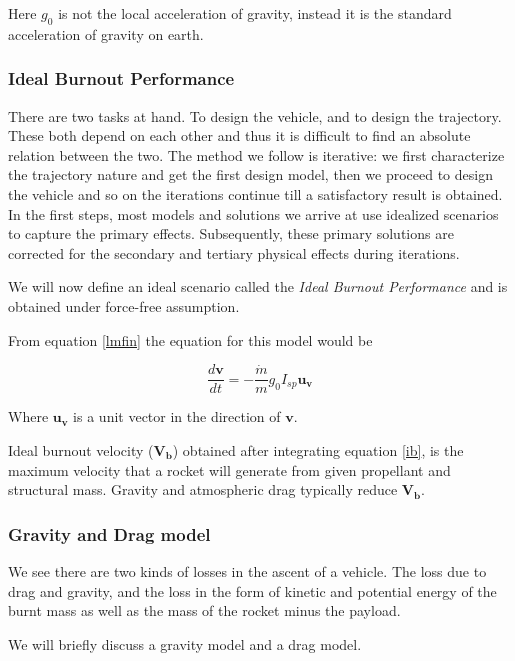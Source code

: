 \documentclass{article}
\theoremstyle{definition}
\begin{document}
Here $g_0$ is not the local acceleration of gravity, instead it is the standard acceleration of gravity on earth.

\subsubsection{Ideal Burnout Performance}

There are two tasks at hand. To design the vehicle, and to design the trajectory.
These both depend on each other and thus it is difficult to find an absolute relation between the two.
The method we follow is iterative: we first characterize the trajectory nature and get the first design model, then we proceed to design the vehicle and so on the iterations continue till a satisfactory result is obtained.
In the first steps, most models and solutions we arrive at use idealized scenarios to capture the primary effects. Subsequently, these primary solutions are corrected for the secondary and tertiary physical effects during iterations.

We will now define an ideal scenario called the \emph{Ideal Burnout Performance} and is obtained under force-free assumption.

From equation \ref{lmfin} the equation for this model would be

\begin{equation}\label{ib}
    \frac{d\boldsymbol{v}}{dt} = -\frac{\Dot{m}}{m} g_0 I_{sp} \boldsymbol{u_v}
\end{equation}

Where $\boldsymbol{u_v}$ is a unit vector in the direction of $\boldsymbol{v}$.

Ideal burnout velocity ($\boldsymbol{V_b}$) obtained after integrating equation \ref{ib}, is the maximum velocity that a rocket will generate from given propellant and structural mass.
Gravity and atmospheric drag typically reduce $\boldsymbol{V_b}$. 

\subsubsection{Gravity and Drag model}

We see there are two kinds of losses in the ascent of a vehicle. The loss due to drag and gravity, and the loss in the form of kinetic and potential energy of the burnt mass as well as the mass of the rocket minus the payload.

We will briefly discuss a gravity model and a drag model.
\end{document}
